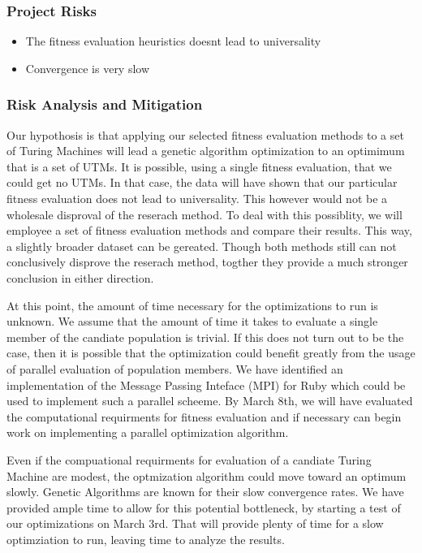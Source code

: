 \subsubsection{Project Risks}
\begin{itemize}
\item The fitness evaluation heuristics doesnt lead to universality
\item Convergence is very slow
\end{itemize}

\subsubsection{Risk Analysis and Mitigation}
Our hypothosis is that applying our selected fitness evaluation methods to a set of Turing Machines will lead a genetic algorithm optimization to an optimimum that is a set of UTMs. It is possible, using a single fitness evaluation, that we could get no UTMs. In that case, the data will have shown that our particular fitness evaluation does not lead to universality. This however would not be a wholesale disproval of the reserach method. To deal with this possiblity, we will employee a set of fitness evaluation methods and compare their results. This way, a slightly broader dataset can be gereated. Though both methods still can not conclusively disprove the reserach method, togther they provide a much stronger conclusion in either direction. 
    
At this point, the amount of time necessary for the optimizations to run is unknown. We assume that the amount of time it takes to evaluate a single member of the candiate population is trivial. If this does not turn out to be the case, then it is possible that the optimization could benefit greatly from the usage of parallel evaluation of population members. We have identified an implementation of the Message Passing Inteface (MPI) for Ruby which could be used to implement such a parallel scheeme. By March 8th, we will have evaluated the computational requirments for fitness evaluation and if necessary can begin work on implementing a parallel optimization algorithm.

Even if the compuational requirments for evaluation of a candiate Turing Machine are modest, the optmization algorithm could move toward an optimum slowly. Genetic Algorithms are known for their slow convergence rates. We have provided ample time to allow for this potential bottleneck, by starting a test of our optimizations on March 3rd. That will provide plenty of time for a slow optimziation to run, leaving time to analyze the results. 

